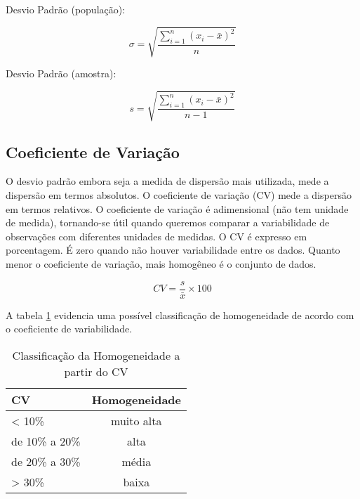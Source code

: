 Desvio Padrão (população):

\[ \sigma=\sqrt{\frac{\sum_{i=1}^{n} (x_i - \bar{x})^2}{n}} \]

Desvio Padrão (amostra):

\[ s=\sqrt{\frac{\sum_{i=1}^{n} (x_i - \bar{x})^2}{n-1}} \]

\subsection{Coeficiente de Variação}

O desvio padrão embora seja a medida de dispersão mais utilizada, mede a dispersão em termos absolutos. O coeficiente de variação (CV) mede a dispersão em termos relativos. O coeficiente de variação é adimensional (não tem unidade de medida), tornando-se útil quando queremos comparar a variabilidade de observações com diferentes unidades de medidas. O CV é expresso em porcentagem. É zero quando não houver variabilidade entre os dados. Quanto menor o coeficiente de variação, mais
homogêneo é o conjunto de dados.

\[ CV=\frac{s}{\bar{x}} \times 100 \]

\newpage

A tabela \ref{tab:coeficiente-variabilidade} evidencia uma possível classificação de homogeneidade de acordo com o coeficiente de variabilidade.

\begin{table}
	\centering	
	\caption{Classificação da Homogeneidade a partir do CV}
	\label{tab:coeficiente-variabilidade}
	\begin{tabular}{l|c} 
		CV 		& Homogeneidade	\\
		\hline
		< 10\%		& muito alta	\\
		de 10\% a 20\%	& alta		\\
		de 20\% a 30\%	& média		\\
		> 30\%			& baixa		
	\end{tabular}
\end{table}

